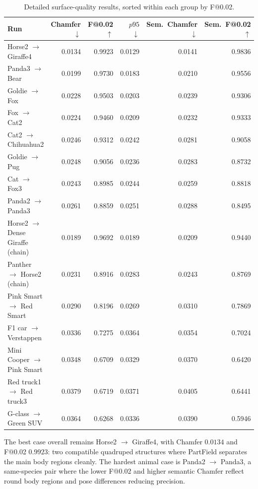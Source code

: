 \documentclass{article}
\makeatletter
\newcommand{\Fscore}{F@0.02}
\newcommand{\Chamfer}{Chamfer}
\makeatother
\begin{document}
\begin{table}[H]
\centering
\small
\begin{tabularx}{\textwidth}{lrrrrr}
\toprule
Run & \Chamfer{} $\downarrow$ & \Fscore{} $\uparrow$ & $p95$ $\downarrow$ & Sem.\ \Chamfer{} $\downarrow$ & Sem.\ \Fscore{} $\uparrow$ \\
\midrule
Horse2 $\rightarrow$ Giraffe4 & 0.0134 & 0.9923 & 0.0129 & 0.0141 & 0.9836 \\
Panda3 $\rightarrow$ Bear & 0.0199 & 0.9730 & 0.0183 & 0.0210 & 0.9556 \\
Goldie $\rightarrow$ Fox & 0.0228 & 0.9503 & 0.0203 & 0.0239 & 0.9306 \\
Fox $\rightarrow$ Cat2 & 0.0224 & 0.9460 & 0.0209 & 0.0232 & 0.9333 \\
Cat2 $\rightarrow$ Chihuahua2 & 0.0246 & 0.9312 & 0.0242 & 0.0281 & 0.9058 \\
Goldie $\rightarrow$ Pug & 0.0248 & 0.9056 & 0.0236 & 0.0283 & 0.8732 \\
Cat $\rightarrow$ Fox3 & 0.0243 & 0.8985 & 0.0244 & 0.0259 & 0.8818 \\
Panda2 $\rightarrow$ Panda3 & 0.0261 & 0.8859 & 0.0251 & 0.0288 & 0.8495 \\
\midrule
Horse2 $\rightarrow$ Dense Giraffe (chain) & 0.0189 & 0.9692 & 0.0189 & 0.0209 & 0.9440 \\
Panther $\rightarrow$ Horse2 (chain) & 0.0231 & 0.8916 & 0.0283 & 0.0243 & 0.8769 \\
\midrule
Pink Smart $\rightarrow$ Red Smart & 0.0290 & 0.8196 & 0.0269 & 0.0310 & 0.7869 \\
F1 car $\rightarrow$ Verstappen & 0.0336 & 0.7275 & 0.0364 & 0.0354 & 0.7024 \\
Mini Cooper $\rightarrow$ Pink Smart & 0.0348 & 0.6709 & 0.0329 & 0.0370 & 0.6420 \\
Red truck1 $\rightarrow$ Red truck3 & 0.0379 & 0.6719 & 0.0371 & 0.0405 & 0.6441 \\
G-class $\rightarrow$ Green SUV & 0.0364 & 0.6268 & 0.0336 & 0.0390 & 0.5946 \\
\bottomrule
\end{tabularx}
\caption{Detailed surface-quality results, sorted within each group by \Fscore{}.}
\label{tab:sam3d-detail}
\end{table}

The best case overall remains Horse2 $\rightarrow$ Giraffe4, with \Chamfer{} $0.0134$ and \Fscore{}
$0.9923$: two compatible quadruped structures where PartField separates the main body regions
cleanly. The hardest animal case is Panda2 $\rightarrow$ Panda3, a same-species pair where the lower
\Fscore{} and higher semantic Chamfer reflect round body regions and pose differences reducing
precision.
\end{document}
